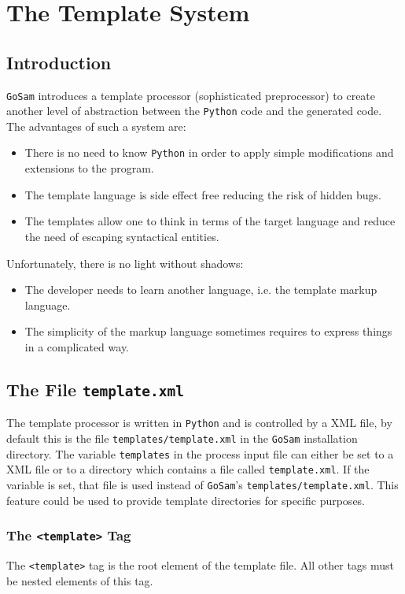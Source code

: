 \documentclass[11pt,a4paper]{refrep}
\newcommand{\golem}{{\tt GoSam}\xspace}
\newcommand{\python}{{\tt Python}\xspace}
\begin{document}
\chapter{The Template System}
\section{Introduction}
\golem{} introduces a template processor (sophisticated preprocessor)
to create another level of abstraction between the \python{} code and
the generated code. The advantages of such a system are:
\begin{itemize}
\item There is no need to know \python{} in order to apply simple
   modifications and extensions to the program.
\item The template language is side effect free reducing the risk
   of hidden bugs.
\item The templates allow one to think in terms of the target language
   and reduce the need of escaping syntactical entities.
\end{itemize}
Unfortunately, there is no light without shadows:
\begin{itemize}
\item The developer needs to learn another language, i.e. the
   template markup language.
\item The simplicity of the markup language sometimes requires
   to express things in a complicated way.
\end{itemize}

\section{The File \texttt{template.xml}}
The template processor is written in \python{} and is controlled
by a XML file, by default this is the file \texttt{templates/template.xml}
in the \golem{} installation directory.
\attention The variable \texttt{templates} in the process input file
can either be set to a XML file or to a directory which contains
a file called \texttt{template.xml}.
If the variable is set, that
file is used instead of \golem{}'s \texttt{templates/template.xml}.
This feature could be used to provide template directories for specific
purposes.

\subsection{The \texttt{<template>} Tag}
The \texttt{<template>} tag is the root element of the template file.
All other tags must be nested elements of this tag.
\end{document}
